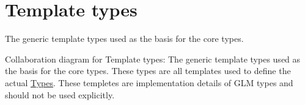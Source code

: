 \hypertarget{group__core__template}{\section{Template types}
\label{group__core__template}
}


The generic template types used as the basis for the core types.  


Collaboration diagram for Template types\-:
The generic template types used as the basis for the core types. These types are all templates used to define the actual \hyperlink{group__core__types}{Types}. These templetes are implementation details of G\-L\-M types and should not be used explicitly. 